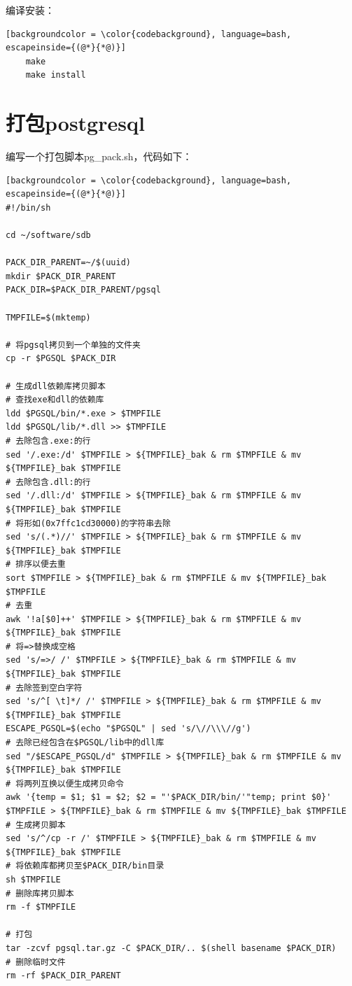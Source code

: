 编译安装：

\begin{lstlisting}[backgroundcolor = \color{codebackground}, language=bash, escapeinside={(@*}{*@)}]
	make	
	make install
\end{lstlisting}

\section{打包postgresql}

编写一个打包脚本pg\_pack.sh，代码如下：

\begin{lstlisting}[backgroundcolor = \color{codebackground}, language=bash, escapeinside={(@*}{*@)}]
#!/bin/sh

cd ~/software/sdb

PACK_DIR_PARENT=~/$(uuid)
mkdir $PACK_DIR_PARENT
PACK_DIR=$PACK_DIR_PARENT/pgsql

TMPFILE=$(mktemp)

# 将pgsql拷贝到一个单独的文件夹
cp -r $PGSQL $PACK_DIR

# 生成dll依赖库拷贝脚本
# 查找exe和dll的依赖库
ldd $PGSQL/bin/*.exe > $TMPFILE
ldd $PGSQL/lib/*.dll >> $TMPFILE
# 去除包含.exe:的行
sed '/.exe:/d' $TMPFILE > ${TMPFILE}_bak & rm $TMPFILE & mv ${TMPFILE}_bak $TMPFILE
# 去除包含.dll:的行
sed '/.dll:/d' $TMPFILE > ${TMPFILE}_bak & rm $TMPFILE & mv ${TMPFILE}_bak $TMPFILE
# 将形如(0x7ffc1cd30000)的字符串去除
sed 's/(.*)//' $TMPFILE > ${TMPFILE}_bak & rm $TMPFILE & mv ${TMPFILE}_bak $TMPFILE
# 排序以便去重
sort $TMPFILE > ${TMPFILE}_bak & rm $TMPFILE & mv ${TMPFILE}_bak $TMPFILE
# 去重
awk '!a[$0]++' $TMPFILE > ${TMPFILE}_bak & rm $TMPFILE & mv ${TMPFILE}_bak $TMPFILE
# 将=>替换成空格
sed 's/=>/ /' $TMPFILE > ${TMPFILE}_bak & rm $TMPFILE & mv ${TMPFILE}_bak $TMPFILE
# 去除签到空白字符
sed 's/^[ \t]*/ /' $TMPFILE > ${TMPFILE}_bak & rm $TMPFILE & mv ${TMPFILE}_bak $TMPFILE
ESCAPE_PGSQL=$(echo "$PGSQL" | sed 's/\//\\\//g')
# 去除已经包含在$PGSQL/lib中的dll库
sed "/$ESCAPE_PGSQL/d" $TMPFILE > ${TMPFILE}_bak & rm $TMPFILE & mv ${TMPFILE}_bak $TMPFILE
# 将两列互换以便生成拷贝命令
awk '{temp = $1; $1 = $2; $2 = "'$PACK_DIR/bin/'"temp; print $0}' $TMPFILE > ${TMPFILE}_bak & rm $TMPFILE & mv ${TMPFILE}_bak $TMPFILE
# 生成拷贝脚本
sed 's/^/cp -r /' $TMPFILE > ${TMPFILE}_bak & rm $TMPFILE & mv ${TMPFILE}_bak $TMPFILE
# 将依赖库都拷贝至$PACK_DIR/bin目录
sh $TMPFILE
# 删除库拷贝脚本
rm -f $TMPFILE

# 打包
tar -zcvf pgsql.tar.gz -C $PACK_DIR/.. $(shell basename $PACK_DIR)
# 删除临时文件
rm -rf $PACK_DIR_PARENT
\end{lstlisting}

